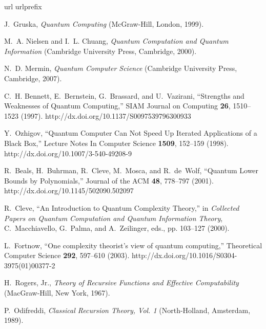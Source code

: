 \documentclass{article}
\begin{document}
\begin{thebibliography}{10}
\newcommand{\enquote}[1]{``#1''}
\expandafter\ifx\csname url\endcsname\relax
  \def\url#1{{#1}}\fi
\expandafter\ifx\csname urlprefix\endcsname\relax\def\urlprefix{}\fi

J.~Gruska, {\em Quantum Computing\/} (McGraw-Hill, London, 1999).

M.~A. Nielsen and I.~L. Chuang, {\em Quantum Computation and Quantum
  Information\/} (Cambridge University Press, Cambridge, 2000).

N.~D. Mermin, {\em Quantum Computer Science\/} (Cambridge University Press,
  Cambridge, 2007).

C.~H. Bennett, E.~Bernstein, G.~Brassard, and U.~Vazirani, \enquote{Strengths
  and Weaknesses of Quantum Computing,} SIAM Journal on Computing {\bf 26},
  1510--1523 (1997).
\newline http://dx.doi.org/10.1137/S0097539796300933

Y.~Ozhigov, \enquote{Quantum Computer Can Not Speed Up Iterated Applications of
  a Black Box,} Lecture Notes In Computer Science {\bf 1509}, 152--159 (1998).
\newline http://dx.doi.org/10.1007/3-540-49208-9

R.~Beals, H.~Buhrman, R.~Cleve, M.~Mosca, and R.~de~Wolf, \enquote{Quantum
  Lower Bounds by Polynomials,} Journal of the ACM {\bf 48}, 778--797 (2001).
\newline http://dx.doi.org/10.1145/502090.502097

R.~Cleve, \enquote{An Introduction to Quantum Complexity Theory,} in {\em
  Collected Papers on Quantum Computation and Quantum Information Theory\/},
  C.~Macchiavello, G.~Palma, and A.~Zeilinger, eds.,  pp. 103--127 (2000).

L.~Fortnow, \enquote{One complexity theorist's view of quantum computing,}
  Theoretical Computer Science {\bf 292}, 597--610 (2003).
\newline http://dx.doi.org/10.1016/S0304-3975(01)00377-2

H.~{Rogers, Jr.}, {\em Theory of Recursive Functions and Effective
  Computability\/} (MacGraw-Hill, New York, 1967).

P.~Odifreddi, {\em Classical Recursion Theory, Vol. 1\/} (North-Holland,
  Amsterdam, 1989).


\end{thebibliography}
\end{document}
